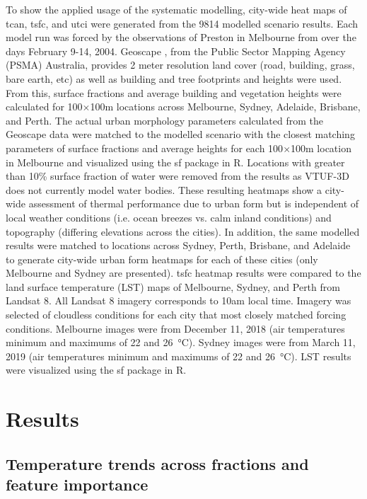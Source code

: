\documentclass[final,3p,times,authoryear]{elsarticle}
\begin{document}
To show the applied usage of the systematic modelling, city-wide heat maps of \gls{tcan}, \gls{tsfc}, and \gls{utci} were generated from the 9814 modelled scenario results. Each model run was forced by the observations of Preston in Melbourne from \cite{Coutts2007} over the days February 9-14, 2004. Geoscape \citep{Geoscape2020}, from the Public Sector Mapping Agency (PSMA) Australia, provides 2 meter resolution land cover (road, building, grass, bare earth, etc) as well as building and tree footprints and heights were used. From this, surface fractions and average building and vegetation heights were calculated for 100$\times$100m locations across Melbourne, Sydney, Adelaide, Brisbane, and Perth. The actual urban morphology parameters calculated from the Geoscape data were matched to the modelled scenario with the closest matching parameters of surface fractions and average heights for each 100$\times$100m location in Melbourne and visualized using the sf package \citep{Pebesma2018} in R. Locations with greater than 10\% surface fraction of water were removed from the results as VTUF-3D does not currently model water bodies. These resulting heatmaps show a city-wide assessment of thermal performance due to urban form but is independent of local weather conditions (i.e. ocean breezes vs. calm inland conditions) and topography (differing elevations across the cities). In addition, the same modelled results were matched to locations across Sydney, Perth, Brisbane, and Adelaide to generate city-wide urban form heatmaps for each of these cities (only Melbourne and Sydney are presented). \gls{tsfc} heatmap results were compared to the land surface temperature (LST) maps of Melbourne, Sydney, and Perth from Landsat 8. All Landsat 8 imagery corresponds to 10am local time. Imagery was selected of cloudless conditions for each city that most closely matched forcing conditions. Melbourne images were from December 11, 2018  (air temperatures minimum and maximums of 22 and 26\SI{}{\degreeCelsius}). Sydney images were from March 11, 2019  (air temperatures minimum and maximums of 22 and 26\SI{}{\degreeCelsius}). LST results were visualized using the sf package \citep{Pebesma2018} in R.

\section{Results}\label{sec:results}

\subsection{Temperature trends across fractions and feature importance}\label{sec:resulttrends}
\end{document}
